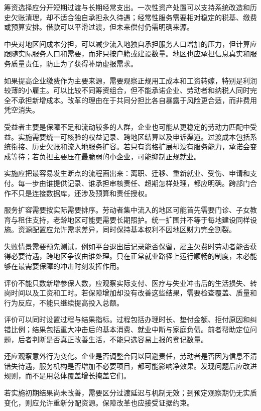 \documentclass[UTF8,fontset=fandol,zihao=-4,oneside,openany]{ctexbook}
\begin{document}
\label{arg:P251}
筹资选择应分开短期过渡与长期经常支出。一次性资产处置可以支持系统改造和历史欠账清理，却不适合独自承担永久待遇；经常性服务需要相对稳定的税基、缴费或预算安排。借款可以平滑过渡，但未来偿付仍需明确来源。

中央对地区间成本分担，可以减少流入地独自承担服务人口增加的压力，但计算应跟随实际服务人口和需要，而非只按户籍或建设数量。地区也应承担信息真实和服务质量责任，防止为了获得补助虚报需求。

如果提高企业缴费作为主要来源，需要观察正规用工成本和工资转嫁，特别是利润较薄的小雇主。可以比较不同筹资组合，但不能承诺企业、劳动者和纳税人同时完全不承担新增成本。改革的理由在于共同分担比各自暴露于风险更合适，而非费用凭空消失。

受益者主要是保障不足和流动较多的人群，企业也可能从更稳定的劳动力匹配中受益。实施需要统一可核验的权益记录、跨地区结算以及申诉渠道。过渡成本包括系统衔接、历史欠账和流入地服务扩容。若只有资格扩展却没有服务能力，承诺会变成等待；若负担主要压在最脆弱的小企业，可能抑制正规就业。

\label{arg:P252}
实施应把最容易发生断点的流程画出来：离职、迁移、重新就业、受伤、申请和支付。每一步由谁提供记录、谁承担审核责任、超期怎样处理，都应明确。跨部门合作不只是连接数据库，还涉及预算和责任授权。

服务扩容需要按实际需要排序。劳动者集中流入的地区可能首先需要门诊、子女教育与租住支持，老龄地区可能更需要长期照护。统一扩围并不等于每地建设同样设施。资源配置应允许需求差异，同时保持基本权利不因地区财力完全割裂。

失败情景需要预先测试，例如平台退出后记录能否保留，雇主欠费时劳动者能否获得必要待遇，跨地区争议由谁处理。只在正常就业路径上运行顺畅的制度，未必能够在最需要保障的冲击时刻发挥作用。

评价不能只数新增参保人数，应观察实际支付、医疗与失业冲击后的生活损失、转岗时间以及工资和工时。若保障增加却没有改善这些结果，需要检查覆盖、质量和行为反应，不能只继续提高投入总额。

\label{arg:P253}
评价可以同时设置过程与结果指标。过程包括办理时长、垫付金额、拒付原因和纠错比例；结果包括重大冲击后的基本消费、就业中断与家庭负债。前者帮助定位问题，后者判断是否真正改善生活，不能只选容易上报的登记数量。

还应观察意外行为变化。企业是否调整合同以回避责任，劳动者是否因为信息不清错失待遇，服务机构是否增加不必要项目，都可能影响净效果。发现问题后应改进规则，而不是用总体覆盖增长掩盖它们。

若实施初期结果尚未改善，需要区分过渡延迟与机制无效；到预定观察期仍无实质变化，则应允许重新分配资源。保障改革也应接受证据约束。
\end{document}
